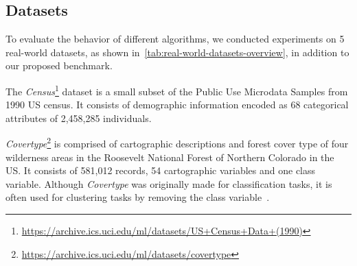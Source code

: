 




\subsection{Datasets}
To evaluate the behavior of different algorithms, we conducted experiments on 5 real-world datasets, as shown in~\cref{tab:real-world-datasets-overview}, in addition to our proposed benchmark.


The \textit{Census}\footnote{\url{https://archive.ics.uci.edu/ml/datasets/US+Census+Data+(1990)}} dataset is a small subset of the Public Use Microdata Samples from 1990 US census. It consists of demographic information encoded as 68 categorical attributes of 2,458,285 individuals. 

\textit{Covertype}\footnote{\url{https://archive.ics.uci.edu/ml/datasets/covertype}} is comprised of cartographic descriptions and forest cover type of four wilderness areas in the Roosevelt National Forest of Northern Colorado in the US. It consists of 581,012 records, 54 cartographic variables and one class variable. Although \textit{Covertype} was originally made for classification tasks, it is often used for clustering tasks by removing the class variable~\cite{AckermannMRSLS12}.

